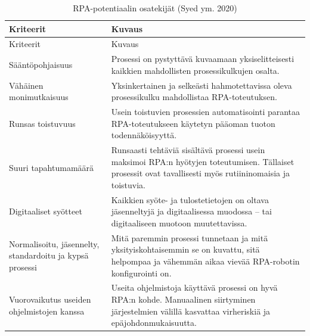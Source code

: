 \documentclass[
  finnish,
  letterpaper,
  DIV=11,
  numbers=noendperiod,
  oneside]{scrreprt}
\begin{document}
\begin{longtable}[]{@{}
  >{\raggedright\arraybackslash}p{}
  >{\raggedright\arraybackslash}p{}@{}}
\caption{RPA-potentiaalin osatekijät (Syed ym.
2020)}\label{tbl-rpa-yhtveto}\tabularnewline
\toprule\noalign{}
\begin{minipage}[b]{\linewidth}\raggedright
Kriteerit
\end{minipage} & \begin{minipage}[b]{\linewidth}\raggedright
Kuvaus
\end{minipage} \\
\midrule\noalign{}
\endfirsthead
\toprule\noalign{}
\begin{minipage}[b]{\linewidth}\raggedright
Kriteerit
\end{minipage} & \begin{minipage}[b]{\linewidth}\raggedright
Kuvaus
\end{minipage} \\
\midrule\noalign{}
\endhead
\bottomrule\noalign{}
\endlastfoot
Sääntöpohjaisuus & Prosessi on pystyttävä kuvaamaan yksiselitteisesti
kaikkien mahdollisten prosessikulkujen osalta. \\
Vähäinen monimutkaisuus & Yksinkertainen ja selkeästi hahmotettavissa
oleva prosessikulku mahdollistaa RPA-toteutuksen. \\
Runsas toistuvuus & Usein toistuvien prosessien automatisointi parantaa
RPA-toteutukseen käytetyn pääoman tuoton todennäköisyyttä. \\
Suuri tapahtumamäärä & Runsaasti tehtäviä sisältävä prosessi usein
maksimoi RPA:n hyötyjen toteutumisen. Tällaiset prosessit ovat
tavallisesti myös rutiininomaisia ja toistuvia. \\
Digitaaliset syötteet & Kaikkien syöte- ja tulostetietojen on oltava
jäsenneltyjä ja digitaalisessa muodossa -- tai digitaaliseen muotoon
muutettavissa. \\
Normalisoitu, jäsennelty, standardoitu ja kypsä prosessi & Mitä paremmin
prosessi tunnetaan ja mitä yksityiskohtaisemmin se on kuvattu, sitä
helpompaa ja vähemmän aikaa vievää RPA-robotin konfigurointi on. \\
Vuorovaikutus useiden ohjelmistojen kanssa & Useita ohjelmistoja
käyttävä prosessi on hyvä RPA:n kohde. Manuaalinen siirtyminen
järjestelmien välillä kasvattaa virheriskiä ja epäjohdonmukaisuutta. \\
\end{longtable}
\end{document}
